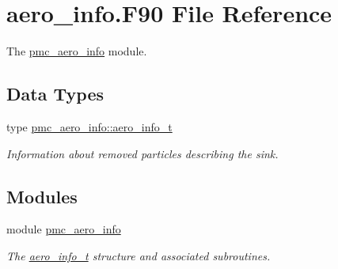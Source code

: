 \hypertarget{aero__info_8_f90}{}\section{aero\+\_\+info.\+F90 File Reference}
\label{aero__info_8_f90}


The \mbox{\hyperlink{namespacepmc__aero__info}{pmc\+\_\+aero\+\_\+info}} module.  


\subsection*{Data Types}
\begin{DoxyCompactItemize}
\item 
type \mbox{\hyperlink{structpmc__aero__info_1_1aero__info__t}{pmc\+\_\+aero\+\_\+info\+::aero\+\_\+info\+\_\+t}}
\begin{DoxyCompactList}\small\item\em Information about removed particles describing the sink. \end{DoxyCompactList}\end{DoxyCompactItemize}
\subsection*{Modules}
\begin{DoxyCompactItemize}
\item 
module \mbox{\hyperlink{namespacepmc__aero__info}{pmc\+\_\+aero\+\_\+info}}
\begin{DoxyCompactList}\small\item\em The \mbox{\hyperlink{structpmc__aero__info_1_1aero__info__t}{aero\+\_\+info\+\_\+t}} structure and associated subroutines. \end{DoxyCompactList}\end{DoxyCompactItemize}
